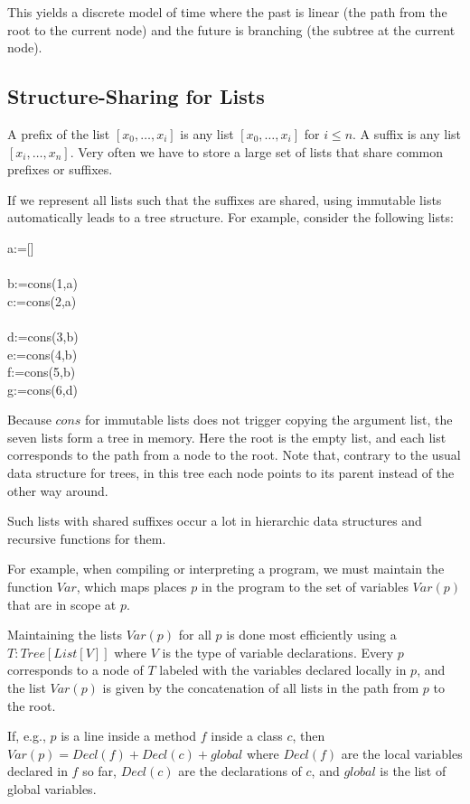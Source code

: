 This yields a discrete model of time where the past is linear (the path from the root to the current node) and the future is branching (the subtree at the current node).

\subsection{Structure-Sharing for Lists}

A prefix of the list $[x_0,\ldots,x_i]$ is any list $[x_0,\ldots,x_i]$ for $i\leq n$.
A suffix is any list $[x_i,\ldots,x_n]$.
Very often we have to store a large set of lists that share common prefixes or suffixes.

If we represent all lists such that the suffixes are shared, using immutable lists automatically leads to a tree structure.
For example, consider the following lists:
\begin{acode}
a:=[]\\
\\
b:=cons(1,a)\\
c:=cons(2,a)\\
\\
d:=cons(3,b)\\
e:=cons(4,b)\\
f:=cons(5,b)\\
g:=cons(6,d)
\end{acode}
Because $cons$ for immutable lists does not trigger copying the argument list, the seven lists form a tree in memory.
Here the root is the empty list, and each list corresponds to the path from a node to the root.
Note that, contrary to the usual data structure for trees, in this tree each node points to its parent instead of the other way around.

Such lists with shared suffixes occur a lot in hierarchic data structures and recursive functions for them.

For example, when compiling or interpreting a program, we must maintain the function $Var$, which maps places $p$ in the program to the set of variables $Var(p)$ that are in scope at $p$.

Maintaining the lists $Var(p)$ for all $p$ is done most efficiently using a $T:Tree[List[V]]$ where $V$ is the type of variable declarations.
Every $p$ corresponds to a node of $T$ labeled with the variables declared locally in $p$, and the list $Var(p)$ is given by the concatenation of all lists in the path from $p$ to the root.

If, e.g., $p$ is a line inside a method $f$ inside a class $c$, then $Var(p)=Decl(f)+Decl(c)+global$ where $Decl(f)$ are the local variables declared in $f$ so far, $Decl(c)$ are the declarations of $c$, and $global$ is the list of global variables.




